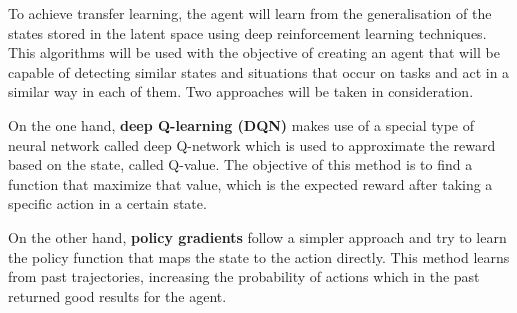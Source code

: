 To achieve transfer learning, the agent will learn from the generalisation of the states stored in the latent space using deep reinforcement learning techniques. This algorithms will be used with the objective of creating an agent that will be capable of detecting similar states and situations that occur on tasks and act in a similar way in each of them. Two approaches will be taken in consideration.

On the one hand, \textbf{deep Q-learning (DQN)} makes use of a special type of neural network called deep Q-network which is used to approximate the reward based on the state, called Q-value. The objective of this method is to find a function that maximize that value, which is the expected reward after taking a specific action in a certain  state.  


On the other hand, \textbf{policy gradients} follow a simpler approach and try to learn the policy function that maps the state to the action directly. This method learns from past trajectories, increasing the probability of actions which in the past returned good results for the agent.






